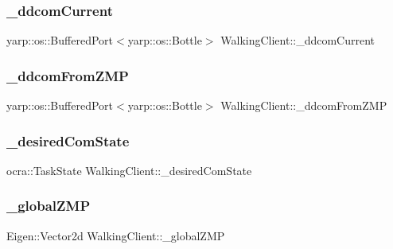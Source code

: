 \subsubsection{\texorpdfstring{\+\_\+ddcom\+Current}{\_ddcomCurrent}}
{\footnotesize\ttfamily yarp\+::os\+::\+Buffered\+Port$<$yarp\+::os\+::\+Bottle$>$ Walking\+Client\+::\+\_\+ddcom\+Current\hspace{0.3cm}{\ttfamily [private]}}

\hypertarget{classWalkingClient_a41b7320607812418af496b8b2c30204f}{}\label{classWalkingClient_a41b7320607812418af496b8b2c30204f} 
\subsubsection{\texorpdfstring{\+\_\+ddcom\+From\+Z\+MP}{\_ddcomFromZMP}}
{\footnotesize\ttfamily yarp\+::os\+::\+Buffered\+Port$<$yarp\+::os\+::\+Bottle$>$ Walking\+Client\+::\+\_\+ddcom\+From\+Z\+MP\hspace{0.3cm}{\ttfamily [private]}}

\hypertarget{classWalkingClient_a2625bf687aa3141f5a2404c8d9b3c392}{}\label{classWalkingClient_a2625bf687aa3141f5a2404c8d9b3c392} 
\subsubsection{\texorpdfstring{\+\_\+desired\+Com\+State}{\_desiredComState}}
{\footnotesize\ttfamily ocra\+::\+Task\+State Walking\+Client\+::\+\_\+desired\+Com\+State\hspace{0.3cm}{\ttfamily [private]}}

\hypertarget{classWalkingClient_aa784eac1247f0d858e2364e0c2bc25b2}{}\label{classWalkingClient_aa784eac1247f0d858e2364e0c2bc25b2} 
\subsubsection{\texorpdfstring{\+\_\+global\+Z\+MP}{\_globalZMP}}
{\footnotesize\ttfamily Eigen\+::\+Vector2d Walking\+Client\+::\+\_\+global\+Z\+MP\hspace{0.3cm}{\ttfamily [private]}}

